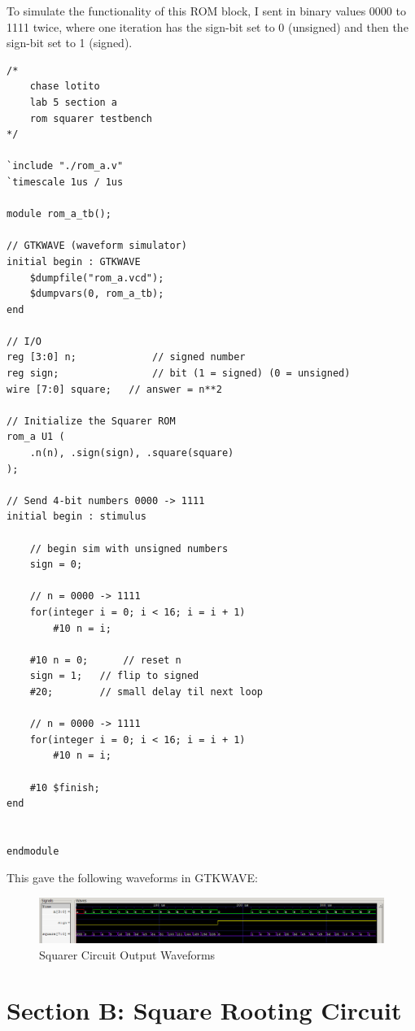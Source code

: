 \documentclass{article}
\begin{document}
To simulate the functionality of this ROM block, I sent in binary values 0000 to 1111 twice, where one iteration has the sign-bit set to 0 (unsigned) and then the sign-bit set to 1 (signed).

\begin{lstlisting}
/*
    chase lotito
    lab 5 section a
    rom squarer testbench
*/

`include "./rom_a.v"
`timescale 1us / 1us

module rom_a_tb();

// GTKWAVE (waveform simulator)
initial begin : GTKWAVE
    $dumpfile("rom_a.vcd");
    $dumpvars(0, rom_a_tb);
end

// I/O
reg [3:0] n;             // signed number
reg sign;                // bit (1 = signed) (0 = unsigned)
wire [7:0] square;   // answer = n**2

// Initialize the Squarer ROM
rom_a U1 (
    .n(n), .sign(sign), .square(square)
);

// Send 4-bit numbers 0000 -> 1111
initial begin : stimulus

    // begin sim with unsigned numbers
    sign = 0;

    // n = 0000 -> 1111
    for(integer i = 0; i < 16; i = i + 1)
        #10 n = i;

    #10 n = 0;      // reset n
    sign = 1;   // flip to signed
    #20;        // small delay til next loop

    // n = 0000 -> 1111
    for(integer i = 0; i < 16; i = i + 1)
        #10 n = i;

    #10 $finish;
end


endmodule
\end{lstlisting}

This gave the following waveforms in GTKWAVE:

\begin{figure}[!ht] 
    \centering
    \includegraphics*[width = 15.1cm]{rom_a_waves.png}
    \caption{Squarer Circuit Output Waveforms}
    \label{fig:squarerWaves}
\end{figure}    

\section*{Section B: Square Rooting Circuit}
\end{document}
